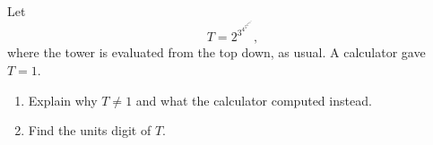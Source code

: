 Let
\[
T=2^{3^{4^{5^{6^{7^{8^{9^{0}}}}}}}},
\]
where the tower is evaluated from the top down, as usual. A calculator gave $T=1$.
\begin{enumerate}
\item[(a)] Explain why $T\ne1$ and what the calculator computed instead.
\item[(b)] Find the units digit of $T$.
\end{enumerate}
